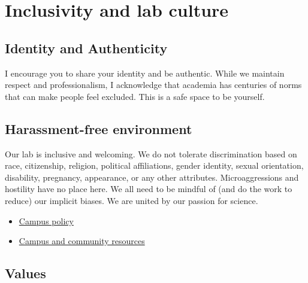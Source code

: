 \documentclass[
  letterpaper,
  DIV=11,
  numbers=noendperiod]{scrreprt}
\providecommand{\tightlist}{%
  \setlength{\itemsep}{0pt}\setlength{\parskip}{0pt}}\usepackage{longtable,booktabs,array}
\begin{document}
\section*{Inclusivity and lab
culture}\label{inclusivity-and-lab-culture}


\subsection*{Identity and Authenticity}\label{identity-and-authenticity}

I encourage you to share your identity and be authentic. While we
maintain respect and professionalism, I acknowledge that academia has
centuries of norms that can make people feel excluded. This is a safe
space to be yourself.

\subsection*{Harassment-free
environment}\label{harassment-free-environment}

Our lab is inclusive and welcoming. We do not tolerate discrimination
based on race, citizenship, religion, political affiliations, gender
identity, sexual orientation, disability, pregnancy, appearance, or any
other attributes. Microaggressions and hostility have no place here. We
all need to be mindful of (and do the work to reduce) our implicit
biases. We are united by our passion for science.

\begin{itemize}
\tightlist
\item
  \href{https://www.diversity.pitt.edu/notice-nondiscrimination-and-anti-harassment-policy-statement}{Campus
  policy}\\
\item
  \href{https://app.convercent.com/en-US/LandingPage/2d6327d5-9fec-ea11-a974-000d3ab9f296?_=1612800567898}{Campus
  and community resources}
\end{itemize}

\subsection*{Values}\label{values}
\end{document}
